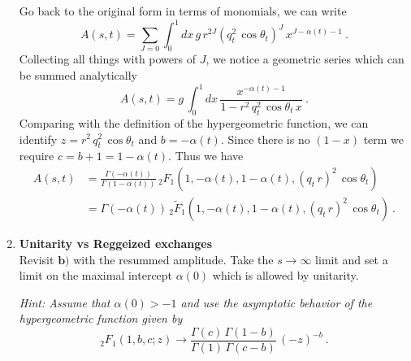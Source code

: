\begin{enumerate}
          \begin{solution}
              Go back to the original form in terms of monomials, we can write
              \begin{equation}
                  A(s,t) = \sum_{J=0} \int_0^1 dx \, g \, r^{2J} (q_t^2 \, \cos\theta_t)^J \, x^{J-\alpha(t)-1} ~.
              \end{equation}
              Collecting all things with powers of $J$, we notice a geometric series which can be summed analytically
              \begin{equation}
                  A(s,t) = g \,\int_0^1 dx \, \frac{x^{-\alpha(t) -1}}{1 - r^2 \, q_t^2 \, \cos\theta_t \, x} ~.
              \end{equation}
              Comparing with the definition of the hypergeometric function, we can identify $z = r^2 \, q_t^2 \, \cos\theta_t$ and $b = -\alpha(t)$. Since there is no $(1-x)$ term we require $c = b+1= 1-\alpha(t)$. Thus we have
              \begin{align}
                  A(s,t) & = \frac{ \Gamma(-\alpha(t))}{\Gamma(1-\alpha(t))} \, _2F_1\left(1,-\alpha(t), 1-\alpha(t), (q_t \,r)^2 \, \cos\theta_t \right)
                  \\
                         & = \Gamma(-\alpha(t)) \,  _2\tilde{F}_1\left(1,-\alpha(t), 1-\alpha(t), (q_t \,r)^2 \, \cos\theta_t \right) ~.
              \end{align}
          \end{solution}

    \item \textbf{Unitarity vs Reggeized exchanges} \\
          Revisit $\mathbf{b)}$ with the resummed amplitude. Take the $s\to\infty$ limit and set a limit on the maximal intercept $\alpha(0)$ which is allowed by unitarity.

          \noindent \textit{Hint: Assume that $\alpha(0) > -1$ and use the asymptotic behavior of the hypergeometric function given by
              \begin{equation}
                  _2F_1(1,b,c;z) \to \frac{\Gamma(c)\,\Gamma(1-b)}{\Gamma(1) \,\Gamma(c-b)} \, (-z)^{-b}  ~.
              \end{equation}
          }


\end{enumerate}

